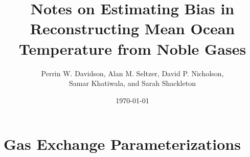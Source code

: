 \documentclass[11pt]{article}
\begin{document}
\title{Notes on Estimating Bias in Reconstructing Mean Ocean Temperature from Noble Gases}

\author{Perrin W. Davidson, Alan M. Seltzer, David P. Nicholson, \\ Samar Khatiwala, and Sarah Shackleton}

\date{\today}

\maketitle


\section*{Gas Exchange Parameterizations}
\end{document}
